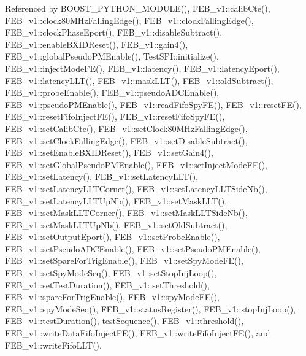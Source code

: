 Referenced by B\+O\+O\+S\+T\+\_\+\+P\+Y\+T\+H\+O\+N\+\_\+\+M\+O\+D\+U\+L\+E(), F\+E\+B\+\_\+v1\+::calib\+Cte(), F\+E\+B\+\_\+v1\+::clock80\+M\+Hz\+Falling\+Edge(), F\+E\+B\+\_\+v1\+::clock\+Falling\+Edge(), F\+E\+B\+\_\+v1\+::clock\+Phase\+Eport(), F\+E\+B\+\_\+v1\+::disable\+Subtract(), F\+E\+B\+\_\+v1\+::enable\+B\+X\+I\+D\+Reset(), F\+E\+B\+\_\+v1\+::gain4(), F\+E\+B\+\_\+v1\+::global\+Pseudo\+P\+M\+Enable(), Test\+S\+P\+I\+::initialize(), F\+E\+B\+\_\+v1\+::inject\+Mode\+F\+E(), F\+E\+B\+\_\+v1\+::latency(), F\+E\+B\+\_\+v1\+::latency\+Eport(), F\+E\+B\+\_\+v1\+::latency\+L\+L\+T(), F\+E\+B\+\_\+v1\+::mask\+L\+L\+T(), F\+E\+B\+\_\+v1\+::old\+Subtract(), F\+E\+B\+\_\+v1\+::probe\+Enable(), F\+E\+B\+\_\+v1\+::pseudo\+A\+D\+C\+Enable(), F\+E\+B\+\_\+v1\+::pseudo\+P\+M\+Enable(), F\+E\+B\+\_\+v1\+::read\+Fifo\+Spy\+F\+E(), F\+E\+B\+\_\+v1\+::reset\+F\+E(), F\+E\+B\+\_\+v1\+::reset\+Fifo\+Inject\+F\+E(), F\+E\+B\+\_\+v1\+::reset\+Fifo\+Spy\+F\+E(), F\+E\+B\+\_\+v1\+::set\+Calib\+Cte(), F\+E\+B\+\_\+v1\+::set\+Clock80\+M\+Hz\+Falling\+Edge(), F\+E\+B\+\_\+v1\+::set\+Clock\+Falling\+Edge(), F\+E\+B\+\_\+v1\+::set\+Disable\+Subtract(), F\+E\+B\+\_\+v1\+::set\+Enable\+B\+X\+I\+D\+Reset(), F\+E\+B\+\_\+v1\+::set\+Gain4(), F\+E\+B\+\_\+v1\+::set\+Global\+Pseudo\+P\+M\+Enable(), F\+E\+B\+\_\+v1\+::set\+Inject\+Mode\+F\+E(), F\+E\+B\+\_\+v1\+::set\+Latency(), F\+E\+B\+\_\+v1\+::set\+Latency\+L\+L\+T(), F\+E\+B\+\_\+v1\+::set\+Latency\+L\+L\+T\+Corner(), F\+E\+B\+\_\+v1\+::set\+Latency\+L\+L\+T\+Side\+Nb(), F\+E\+B\+\_\+v1\+::set\+Latency\+L\+L\+T\+Up\+Nb(), F\+E\+B\+\_\+v1\+::set\+Mask\+L\+L\+T(), F\+E\+B\+\_\+v1\+::set\+Mask\+L\+L\+T\+Corner(), F\+E\+B\+\_\+v1\+::set\+Mask\+L\+L\+T\+Side\+Nb(), F\+E\+B\+\_\+v1\+::set\+Mask\+L\+L\+T\+Up\+Nb(), F\+E\+B\+\_\+v1\+::set\+Old\+Subtract(), F\+E\+B\+\_\+v1\+::set\+Output\+Eport(), F\+E\+B\+\_\+v1\+::set\+Probe\+Enable(), F\+E\+B\+\_\+v1\+::set\+Pseudo\+A\+D\+C\+Enable(), F\+E\+B\+\_\+v1\+::set\+Pseudo\+P\+M\+Enable(), F\+E\+B\+\_\+v1\+::set\+Spare\+For\+Trig\+Enable(), F\+E\+B\+\_\+v1\+::set\+Spy\+Mode\+F\+E(), F\+E\+B\+\_\+v1\+::set\+Spy\+Mode\+Seq(), F\+E\+B\+\_\+v1\+::set\+Stop\+Inj\+Loop(), F\+E\+B\+\_\+v1\+::set\+Test\+Duration(), F\+E\+B\+\_\+v1\+::set\+Threshold(), F\+E\+B\+\_\+v1\+::spare\+For\+Trig\+Enable(), F\+E\+B\+\_\+v1\+::spy\+Mode\+F\+E(), F\+E\+B\+\_\+v1\+::spy\+Mode\+Seq(), F\+E\+B\+\_\+v1\+::status\+Register(), F\+E\+B\+\_\+v1\+::stop\+Inj\+Loop(), F\+E\+B\+\_\+v1\+::test\+Duration(), test\+Sequence(), F\+E\+B\+\_\+v1\+::threshold(), F\+E\+B\+\_\+v1\+::write\+Data\+Fifo\+Inject\+F\+E(), F\+E\+B\+\_\+v1\+::write\+Fifo\+Inject\+F\+E(), and F\+E\+B\+\_\+v1\+::write\+Fifo\+L\+L\+T().


